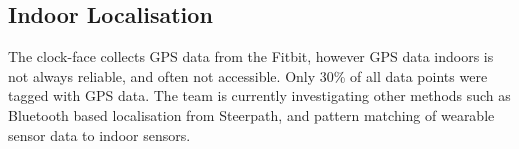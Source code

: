 










\subsection{Indoor Localisation}
\label{ch:localisation}

The clock-face collects GPS data from the Fitbit, however GPS data indoors is not always reliable, and often not accessible. Only 30\% of all data points were tagged with GPS data. The team is currently investigating other methods such as Bluetooth based localisation from Steerpath, and pattern matching of wearable sensor data to indoor sensors.

